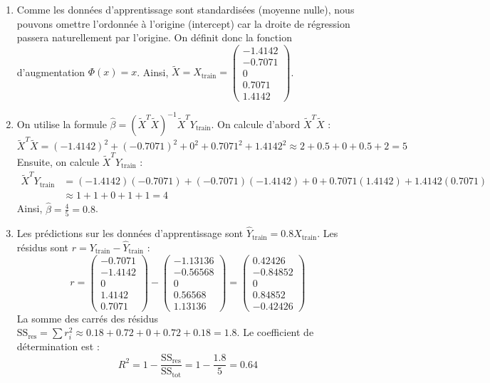 \documentclass[]{../exercices}
\begin{document}
\begin{solution}
	\begin{enumerate}
		\item Comme les données d'apprentissage sont standardisées (moyenne nulle), nous pouvons omettre l'ordonnée à l'origine (intercept) car la droite de régression passera naturellement par l'origine. On définit donc la fonction d'augmentation $\Phi(x) = x$.
		Ainsi, $\tilde{X} = X_{\text{train}} = \begin{pmatrix} -1.4142 \\ -0.7071 \\ 0 \\ 0.7071 \\ 1.4142 \end{pmatrix}$.

		\item On utilise la formule $\hat{\beta} = \left(\tilde{X}^T \tilde{X}\right)^{-1} \tilde{X}^T Y_{\text{train}}$.
		On calcule d'abord $\tilde{X}^T \tilde{X}$ :
		\[
		\tilde{X}^T \tilde{X} = (-1.4142)^2 + (-0.7071)^2 + 0^2 + 0.7071^2 + 1.4142^2 \approx 2 + 0.5 + 0 + 0.5 + 2 = 5
		\]
		Ensuite, on calcule $\tilde{X}^T Y_{\text{train}}$ :
		\begin{align*}
		\tilde{X}^T Y_{\text{train}} &= (-1.4142)(-0.7071) + (-0.7071)(-1.4142) + 0 + 0.7071(1.4142) + 1.4142(0.7071) \\
		&\approx 1 + 1 + 0 + 1 + 1 = 4
		\end{align*}
		Ainsi, $\hat{\beta} = \frac{4}{5} = 0.8$.

		\item Les prédictions sur les données d'apprentissage sont $\hat{Y}_{\text{train}} = 0.8 X_{\text{train}}$.
		Les résidus sont $r = Y_{\text{train}} - \hat{Y}_{\text{train}}$ :
		\[
		r = \begin{pmatrix} -0.7071 \\ -1.4142 \\ 0 \\ 1.4142 \\ 0.7071 \end{pmatrix} - \begin{pmatrix} -1.13136 \\ -0.56568 \\ 0 \\ 0.56568 \\ 1.13136 \end{pmatrix} = \begin{pmatrix} 0.42426 \\ -0.84852 \\ 0 \\ 0.84852 \\ -0.42426 \end{pmatrix}
		\]
		La somme des carrés des résidus $\text{SS}_{\text{res}} = \sum r_i^2 \approx 0.18 + 0.72 + 0 + 0.72 + 0.18 = 1.8$.
		Le coefficient de détermination est :
		\[
		R^2 = 1 - \frac{\text{SS}_{\text{res}}}{\text{SS}_{\text{tot}}} = 1 - \frac{1.8}{5} = 0.64
		\]


\end{enumerate}
\end{solution}
\end{document}
